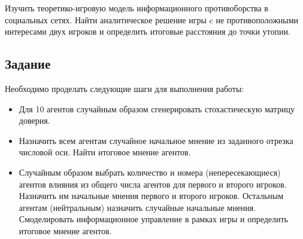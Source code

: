 
Изучить теоретико-игровую модель информационного противоборства в
социальных сетях. Найти аналитическое решение игры c не
противоположными интересами двух игроков и определить итоговые
расстояния до точки утопии.

\subsection*{Задание}

Необходимо проделать следующие шаги для выполнения работы:

\begin{itemize}
  \item Для 10 агентов случайным образом сгенерировать стохастическую матрицу доверия.
  \item Назначить всем агентам случайное начальное мнение из заданного
        отрезка числовой оси. Найти итоговое мнение агентов.
  \item Случайным образом выбрать количество и номера (непересекающиеся)
        агентов влияния из общего числа агентов для первого и второго игроков.
        Назначить им начальные мнения первого и второго игроков. Остальным
        агентам (нейтральным) назначить случайные начальные мнения.
        Смоделировать информационное управление в рамках игры и
        определить итоговое мнение агентов.
\end{itemize}
